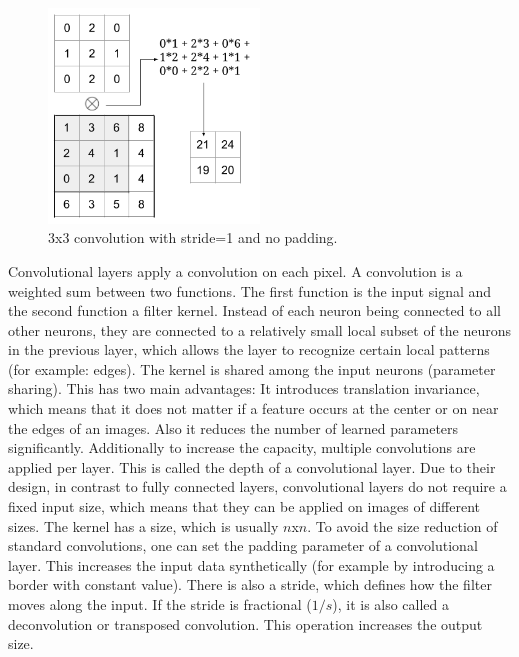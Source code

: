 \documentclass[draft,final,oneside]{vutinfth} %
\begin{document}
\begin{figure}[ht]
	\centering
  	\includegraphics[width=0.5\textwidth]{graphics/convolution.png}
	\caption{3x3 convolution with stride=1 and no padding.}
	\label{fig:convolution}
\end{figure}

Convolutional layers apply a convolution on each pixel. A convolution is a weighted sum between two functions. The first function is the input signal and the second function a filter kernel. Instead of each neuron being connected to all other neurons, they are connected to a relatively small local subset of the neurons in the previous layer, which allows the layer to recognize certain local patterns (for example: edges). The kernel is shared among the input neurons (parameter sharing). This has two main advantages: It introduces translation invariance, which means that it does not matter if a feature occurs at the center or on near the edges of an images. Also it reduces the number of learned parameters significantly. Additionally to increase the capacity, multiple convolutions are applied per layer. This is called the depth of a convolutional layer. Due to their design, in contrast to fully connected layers, convolutional layers do not require a fixed input size, which means that they can be applied on images of different sizes. The kernel has a size, which is usually $n$x$n$. To avoid the size reduction of standard convolutions, one can set the padding parameter of a convolutional layer. This increases the input data synthetically (for example by introducing a border with constant value). There is also a stride, which defines how the filter moves along the input. If the stride is fractional ($1/s$), it is also called a deconvolution or transposed convolution. This operation increases the output size.
\end{document}
